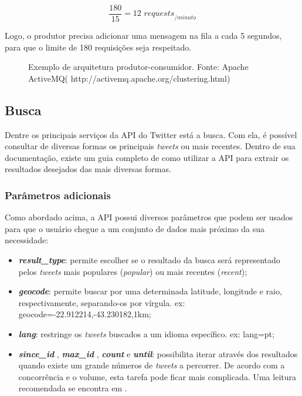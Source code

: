 $$ \frac{180}{15} = 12 \textit{ requests}_{/minuto} $$

Logo, o produtor precisa adicionar uma mensagem na fila a cada 5 segundos, para que o limite de 180 requisições seja respeitado.

\begin{figure}[H]
	\centering{}
	\caption{Exemplo de arquitetura produtor-consumidor. Fonte: Apache ActiveMQ( http://activemq.apache.org/clustering.html)}
	\label{time}
\end{figure}


\subsection{Busca}
Dentre os principais serviços da API do Twitter está a busca. Com ela, é possível consultar de diversas formas os principais \textit{tweets} ou mais recentes. Dentro de sua documentação, existe um guia completo de como utilizar a API  para extrair os resultados desejados \cite{twittersearchapi} das mais diversas formas. 

\subsubsection{Parâmetros adicionais}

Como abordado acima, a API possui diversos parâmetros que podem ser usados para que o usuário chegue a um conjunto de dados mais próximo da sua necessidade:

\begin{itemize}
	\item \textit{\textbf{result\_type}}: permite escolher se o resultado da busca será representado pelos \textit{tweets} mais populares (\textit{popular}) ou mais recentes (\textit{recent});
	\item \textit{\textbf{geocode}}: permite buscar por uma determinada latitude, longitude e raio, respectivamente, separando-os por vírgula. ex: geocode=-22.912214,-43.230182,1km;
	\item \textit{\textbf{lang}}: restringe os \textit{tweets} buscados a um idioma específico. ex: lang=pt;
	\item \textit{\textbf{since\_id }},  \textit{\textbf{max\_id }}, \textit{\textbf{count}} e \textit{\textbf{until}}: possibilita iterar através dos resultados quando existe um grande números de \textit{tweets} a percorrer. De acordo com a concorrência e o volume, esta tarefa pode ficar mais complicada. Uma leitura recomendada se encontra em \cite{workingwithtimelimes}.
\end{itemize}

